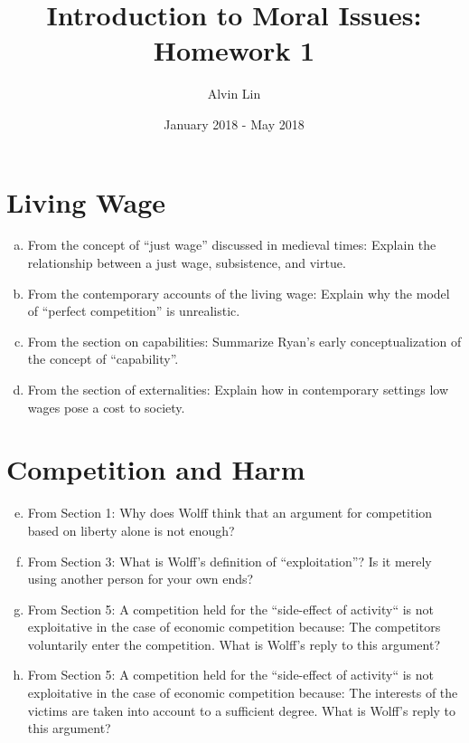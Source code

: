 \documentclass{article}
\title{Introduction to Moral Issues: Homework 1}
\author{Alvin Lin}
\date{January 2018 - May 2018}
\begin{document}
\maketitle

\section*{Living Wage}
\begin{enumerate}[a)]
  \item From the concept of ``just wage'' discussed in medieval times: Explain the relationship between a just wage, subsistence, and virtue.
  \item From the contemporary accounts of the living wage: Explain why the model of ``perfect competition'' is unrealistic.
  \item From the section on capabilities: Summarize Ryan's early conceptualization of the concept of ``capability''.
  \item From the section of externalities: Explain how in contemporary settings low wages pose a cost to society.
\end{enumerate}

\section*{Competition and Harm}
\begin{enumerate}[a)]
  \setcounter{enumi}{4}
  \item From Section 1: Why does Wolff think that an argument for competition based on liberty alone is not enough?
  \item From Section 3: What is Wolff's definition of ``exploitation''? Is it merely using another person for your own ends?
  \item From Section 5: A competition held for the ``side-effect of activity`` is not exploitative in the case of economic competition because: The competitors voluntarily enter the competition. What is Wolff's reply to this argument?
  \item From Section 5: A competition held for the ``side-effect of activity`` is not exploitative in the case of economic competition because: The interests of the victims are taken into account to a sufficient degree. What is Wolff's reply to this argument?
\end{enumerate}
\end{document}
